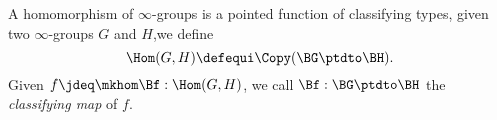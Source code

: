 \begin{definition}
  A homomorphism of $\infty$-groups is a pointed function of classifying types, \ie
  given two $\infty$-groups $G$ and $H$,we define
  \[
    \Hom(G,H)\defequi\Copy(\BG\ptdto\BH).
  \]
  Given $f \jdeq \mkhom\Bf: \Hom(G,H)$, we call
  $\Bf : \BG\ptdto\BH$ the \emph{classifying map} of $f$.
\end{definition}


